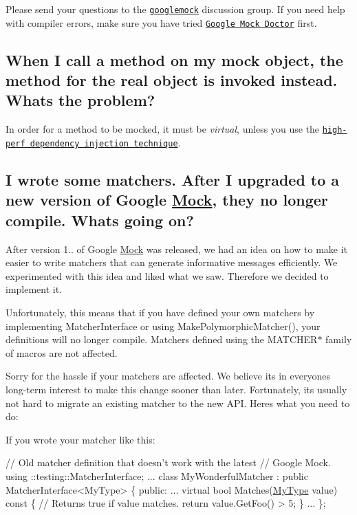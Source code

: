 Please send your questions to the \href{http://groups.google.com/group/googlemock}{\tt googlemock} discussion group. If you need help with compiler errors, make sure you have tried \href{#how-am-i-supposed-to-make-sense-of-these-horrible-template-errors}{\tt Google Mock Doctor} first.

\subsection*{When I call a method on my mock object, the method for the real object is invoked instead. What\textquotesingle{}s the problem?}

In order for a method to be mocked, it must be {\itshape virtual}, unless you use the \href{CookBook.md#mocking-nonvirtual-methods}{\tt high-\/perf dependency injection technique}.

\subsection*{I wrote some matchers. After I upgraded to a new version of Google \hyperlink{classMock}{Mock}, they no longer compile. What\textquotesingle{}s going on?}

After version 1.. of Google \hyperlink{classMock}{Mock} was released, we had an idea on how to make it easier to write matchers that can generate informative messages efficiently. We experimented with this idea and liked what we saw. Therefore we decided to implement it.

Unfortunately, this means that if you have defined your own matchers by implementing {\ttfamily Matcher\+Interface} or using {\ttfamily Make\+Polymorphic\+Matcher()}, your definitions will no longer compile. Matchers defined using the {\ttfamily M\+A\+T\+C\+H\+E\+R$\ast$} family of macros are not affected.

Sorry for the hassle if your matchers are affected. We believe it\textquotesingle{}s in everyone\textquotesingle{}s long-\/term interest to make this change sooner than later. Fortunately, it\textquotesingle{}s usually not hard to migrate an existing matcher to the new A\+PI. Here\textquotesingle{}s what you need to do\+:

If you wrote your matcher like this\+: 
\begin{DoxyCode}
\textcolor{comment}{// Old matcher definition that doesn't work with the latest}
\textcolor{comment}{// Google Mock.}
using ::testing::MatcherInterface;
...
class MyWonderfulMatcher : \textcolor{keyword}{public} MatcherInterface<MyType> \{
 \textcolor{keyword}{public}:
  ...
  \textcolor{keyword}{virtual} \textcolor{keywordtype}{bool} Matches(\hyperlink{classMyType}{MyType} value)\textcolor{keyword}{ const }\{
    \textcolor{comment}{// Returns true if value matches.}
    \textcolor{keywordflow}{return} value.GetFoo() > 5;
  \}
  ...
\};
\end{DoxyCode}


